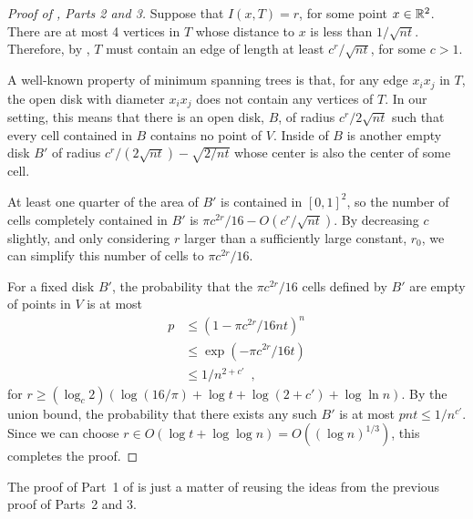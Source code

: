 \documentclass{patmorin}
\begin{document}
\begin{proof}[Proof of , Parts 2 and 3]
Suppose that $I(x,T)=r$, for some point $x\in\mathbb{R}^2$.  There are at most
4 vertices in $T$ whose distance to $x$ is less than $1/\sqrt{nt}$.
Therefore, by , $T$ must contain an edge of length at least
$c^r/\sqrt{nt}$, for some $c>1$.  

A well-known property of minimum spanning trees is that, for any edge
$x_ix_j$ in $T$, the open disk with diameter $x_ix_j$ does not contain
any vertices of $T$.  In our setting, this means that there is an open
disk, $B$, of radius $c^r/2\sqrt{nt}$ such that every cell contained in
$B$ contains no point of $V$.  Inside of $B$ is another empty disk $B'$
of radius $c^r/(2\sqrt{nt})-\sqrt{2/nt}$ whose center is also the center
of some cell.

At least one quarter of the area of $B'$ is contained in $[0,1]^2$,
so the number of cells completely contained in $B'$ is $\pi c^{2r}/16 -
O(c^{r}/\sqrt{nt})$.  By decreasing $c$ slightly, and only considering
$r$ larger than a sufficiently large constant, $r_0$, we can simplify
this number of cells to $\pi c^{2r}/16$.

For a fixed disk $B'$, the probability that the $\pi c^{2r}/16$ cells
defined by $B'$ are empty of points in $V$ is at most
\begin{align*}
 p 
  & \le (1-\pi c^{2r}/{16nt})^{n} \\
  & \le \exp(-\pi c^{2r}/16t) \\
 & \le 1/n^{2+c'} \enspace ,
\end{align*}
for $r\ge(\log_c2)(\log(16/\pi)+\log t + \log(2+c')+\log\ln n)$.  By the union bound, the
probability that there exists any such $B'$ is at most
$pnt\le 1/n^{c'}$.  Since we can choose $r\in O(\log t+\log\log n) = O((\log
n)^{1/3})$, this completes the proof.
\end{proof}

The proof of Part~1 of  is just a matter of reusing the ideas
from the previous proof of Parts~2 and 3.
\end{document}
